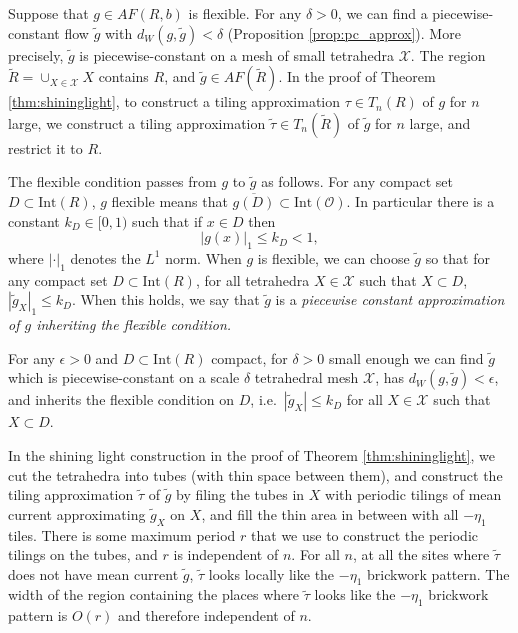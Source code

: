 \documentclass[11pt]{article}
\theoremstyle{remark}
\theoremstyle{definition}
\newcommand{\mc}[1]{\mathcal{#1}}
\begin{document}
Suppose that $g\in AF(R,b)$ is flexible. For any $\delta>0$, we can find a piecewise-constant flow $\widetilde g$ with $d_W(g,\widetilde g)<\delta$ (Proposition \ref{prop:pc_approx}). More precisely, $\widetilde g$ is piecewise-constant on a mesh of small tetrahedra $\mc X$. The region $\widetilde R = \cup_{X\in \mc X} X$ contains $R$, and $\widetilde g\in AF(\widetilde R)$. In the proof of Theorem \ref{thm:shininglight}, to construct a tiling approximation $\tau\in T_n(R)$ of $g$ for $n$ large, we construct a tiling approximation $\widetilde \tau \in T_n(\widetilde R)$ of $\widetilde g$ for $n$ large, and restrict it to $R$. 

The flexible condition passes from $g$ to $\widetilde g$ as follows. For any compact set $D\subset \text{Int}(R)$, $g$ flexible means that $\overline{g(D)}\subset \text{Int}(\mc O)$. In particular there is a constant $k_D\in[0,1)$ such that if $x\in D$ then $$|g(x)|_1\leq k_D < 1,$$ 
where $|\cdot|_1$ denotes the $L^1$ norm. When $g$ is flexible, we can choose $\widetilde g$ so that for any compact set $D\subset \text{Int}(R)$, for all tetrahedra $X\in \mc X$ such that $X\subset D$, $|\widetilde g_X|_1\leq k_D$. When this holds, we say that $\widetilde g$ is a \textit{piecewise constant approximation of $g$ inheriting the flexible condition.}

For any $\epsilon>0$ and $D\subset \text{Int}(R)$ compact, for $\delta>0$ small enough we can find $\widetilde g$ which is piecewise-constant on a scale $\delta$ tetrahedral mesh $\mc X$, has $d_W(g,\widetilde g)<\epsilon$, and inherits the flexible condition on $D$, i.e.\ $|\widetilde g_X|\leq k_D$ for all $X\in \mc X$ such that $X\subset D$. 

In the shining light construction in the proof of Theorem \ref{thm:shininglight}, we cut the tetrahedra into tubes (with thin space between them), and construct the tiling approximation $\widetilde \tau$ of $\widetilde g$ by filing the tubes in $X$ with periodic tilings of mean current approximating $\widetilde g_X$ on $X$, and fill the thin area in between with all $-\eta_1$ tiles. There is some maximum period $r$ that we use to construct the periodic tilings on the tubes, and $r$ is independent of $n$. For all $n$, at all the sites where $\widetilde \tau$ does not have mean current $\widetilde g$, $\widetilde \tau$ looks locally like the $-\eta_1$ brickwork pattern. The width of the region containing the places where $\widetilde \tau$ looks like the $-\eta_1$ brickwork pattern is $O(r)$ and therefore independent of $n$.  
\end{document}
